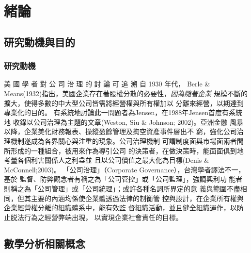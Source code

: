 \documentclass[writingLanguage=chinese,
    addPageTitle=on,
    addDeclaration=on,
    addMUSTlog=off,
    addFigTOC=on,   
    addTabTOC=on,
    refIndent=off,
    printMod=off,
]{.def/must}
\def\Name               {李永建}%
\begin{document}
\ifthenelse{\equal{\Name}{模板}}{\addinfo}{}

\chapter{緒論}
\section{研究動機與目的}
\txtHere{[1]}
\citep{luey2013, turabian2015, WangZhenWu2004, WenZaoWai2009, QiuZiHeng2017, HeDingZhao2019, WuPeiHua2020, QiuJiongYou2014, QiuJiongYou2016, QiuJiongYou2019, LinDongTai2008, LinJing2018, LinWenYao2018, LinXHui2014, HongWenQi2019, HongZhenZhou2018, ChenYaNing9999, ChenXiaMin2019, ZhangYan2016, GuoJiaTu2019, WenDaMao2015, JianYiLing2019, abdoh2019, bordwell2013, bourdieu1990, Co2020, cohen2007, cole2013, deliot2014, foster2017, giles2019, harvey2007, johnson2018, macdonald2020, manguel2009, Milliot2020, paige2017, poff2019, šteger2010, TaiwanNews2019, Villazon2011, wipawin2018}

\subsection{研究動機}
美 國 學 者 對 公 司 治 理 的 討 論 可 追 溯 自 1930 年代， Berle \&
Means(1932)指出，美國企業存在著股權分散的必要性，\textit{因為隨著企業}
規模不斷的擴大，使得多數的中大型公司皆需將經營權與所有權加以
分離來經營，以期達到專業化的目的。
有系統地討論此一問題者為Jensen，在1988年Jensen首度有系統地
收錄以公司治理為主題的文章(Weston, Siu \& Johnson; 2002)。亞洲金融
風暴以降，企業美化財務報表、操縱盈餘管理及掏空資產事件層出不
窮，強化公司治理機制遂成為各界關心與注重的現象。公司治理機制
可謂制度面與市場面兩者間所形成的一種組合，被用來作為導引公司
的決策者，在做決策時，能面面俱到地考量各個利害關係人之利益並
且以公司價值之最大化為目標(Denis \& McConnell;2003)。
「公司治理」（Corporate Governance），台灣學者譯法不一，基於
監督、防弊觀念者有稱之為「公司管控」或「公司監理」，強調興利功
能者則稱之為「公司管理」或「公司統理」；或許各種名詞所界定的意
義與範圍不盡相同，但其主要的內涵均係使企業體透過法律的制衡管
控與設計，在企業所有權與企業經營權分離的組織體系中，能有效監
督組織活動，並且健全組織運作，以防止脱法行為之經營弊端出現，
以實現企業社會責任的目標。




 



\section{數學分析相關概念}
\end{document}
